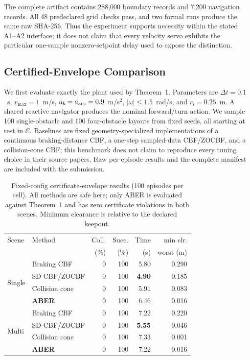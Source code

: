 \documentclass[letterpaper]{article}
\begin{document}
The complete artifact contains 288,000 boundary records and 7,200 navigation
records.  All 48 predeclared grid checks pass, and two formal runs produce the
same raw SHA-256.  Thus the experiment supports necessity within the stated
A1--A2 interface; it does not claim that every velocity servo exhibits the
particular one-sample nonzero-setpoint delay used to expose the distinction.

\subsection{Certified-Envelope Comparison}

We first evaluate exactly the plant used by Theorem~1.  Parameters are
$\Delta t=0.1$~s, $v_{\max}=1$~m/s, $a_b=a_{\rm acc}=0.9$~m/s$^2$,
$|\omega|\le1.5$~rad/s, and $r_i=0.25$~m.  A shared reactive navigator
produces the nominal forward/turn action.  We sample 100 single-obstacle and
100 four-obstacle layouts from fixed seeds, all starting at rest in
$\mathcal C$.  Baselines are fixed geometry-specialized implementations of a
continuous braking-distance CBF, a one-step sampled-data CBF/ZOCBF, and a
collision-cone CBF; this benchmark does not claim to reproduce every tuning
choice in their source papers.  Raw per-episode results and the complete
manifest are included with the submission.

\begin{table}[t]
\centering
\small
\setlength{\tabcolsep}{2.5pt}
\begin{tabular}{llrrrr}
\toprule
Scene & Method & Coll. & Succ. & Time & min clr.\\
 & & (\%) & (\%) & (s) & worst (m)\\
\midrule
\multirow{4}{*}{Single}
 & Braking CBF & 0 & 100 & 5.80 & 0.290\\
 & SD-CBF/ZOCBF & 0 & 100 & \textbf{4.90} & 0.185\\
 & Collision cone & 0 & 100 & 5.91 & 0.083\\
 & \textbf{ABER} & 0 & 100 & 6.46 & 0.016\\
\midrule
\multirow{4}{*}{Multi}
 & Braking CBF & 0 & 100 & 7.22 & 0.220\\
 & SD-CBF/ZOCBF & 0 & 100 & \textbf{5.55} & 0.046\\
 & Collision cone & 0 & 100 & 7.33 & 0.001\\
 & \textbf{ABER} & 0 & 100 & 7.22 & 0.016\\
\bottomrule
\end{tabular}
\caption{Fixed-config certificate-envelope results (100 episodes per cell).
All methods are safe here; only ABER is evaluated against Theorem~1 and has
zero certificate violations in both scenes.  Minimum clearance is relative to
the declared keepout.}
\label{tab:cert}
\end{table}
\end{document}

